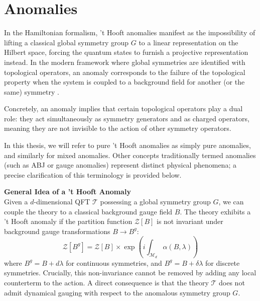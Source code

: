 \documentclass[aps,preprint,nofootinbib,preprintnumbers,eqsecnum,superscriptaddress]{revtex4}
\numberwithin{equation}{section}
\begin{document}
\newpage
\section{Anomalies}

In the Hamiltonian formalism, 't Hooft anomalies manifest as the impossibility of lifting a classical global symmetry group $G$ to a linear representation on the Hilbert space, forcing the quantum states to furnish a projective representation instead. In the modern framework where global symmetries are identified with topological operators, an anomaly corresponds to the failure of the topological property when the system is coupled to a background field for another (or the same) symmetry \cite{McGreevy_2023}. 

Concretely, an anomaly implies that certain topological operators play a dual role: they act simultaneously as symmetry generators and as charged operators, meaning they are not invisible to the action of other symmetry operators.

In this thesis, we will refer to pure 't Hooft anomalies as simply pure anomalies, and similarly for mixed anomalies. Other concepts traditionally termed anomalies (such as ABJ or gauge anomalies) represent distinct physical phenomena; a precise clarification of this terminology is provided below.

\begin{tcolorbox}
{\bf General Idea of a 't Hooft Anomaly} \\
Given a $d$-dimensional QFT $\mathcal{T}$ possessing a global symmetry group $G$, we can couple the theory to a classical background gauge field $B$. The theory exhibits a 't Hooft anomaly if the partition function $\mathcal{Z}[B]$ is not invariant under background gauge transformations $B \to B^g$:
\begin{equation}
    \mathcal{Z}[B^g] = \mathcal{Z}[B] \times \exp \left( i \int_{\mathcal{M}_d} \alpha(B, \lambda) \right)
\end{equation}
where $B^g = B + d\lambda$ for continuous symmetries, and $B^g = B + \delta\lambda$ for discrete symmetries. Crucially, this non-invariance cannot be removed by adding any local counterterm to the action. A direct consequence is that the theory $\mathcal{T}$ does not admit dynamical gauging with respect to the anomalous symmetry group $G$.
\end{tcolorbox} 
\end{document}
